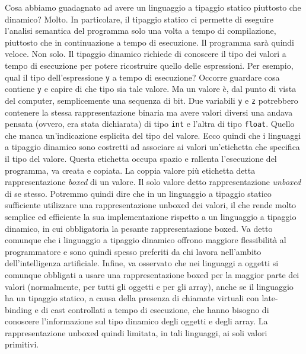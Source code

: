 Cosa abbiamo guadagnato ad avere un linguaggio a tipaggio statico piuttosto
che dina\-mico? Molto. In particolare, il tipaggio statico ci permette di
eseguire l'analisi semantica del programma solo una volta a tempo di
compilazione, piuttosto che in continuazione a tempo di esecuzione.
Il programma sar\`a quindi \piu veloce. Non solo. Il tipaggio dinamico richiede
di conoscere il tipo dei valori a tempo di esecuzione per potere
ricostruire quello delle espressioni. Per
esempio, qual \e il tipo dell'espressione \texttt{y} a tempo di esecuzione?
Occorre guardare cosa contiene \texttt{y} e capire di che tipo sia tale valore.
Ma un valore \`e, dal punto di vista del computer, semplicemente una sequenza
di bit. Due variabili \texttt{y} e \texttt{z} potrebbero contenere la
stessa rappresentazione binaria ma avere valori diversi \poiche una
andava pensata (ovvero, era stata dichiarata)
di tipo \texttt{int} e l'altra di tipo \texttt{float}.
Quello che manca \e un'indicazione esplicita del tipo del valore.
Ecco quindi che i linguaggi a tipaggio dinamico sono costretti
ad associare ai valori un'etichetta che specifica il tipo del valore.
Questa etichetta occupa spazio e rallenta l'esecuzione del programma, \poiche
va creata e copiata.
La coppia valore pi\`u etichetta \e detta rappresentazione \emph{boxed} di
un valore. Il solo valore \e detto rappresentazione \emph{unboxed} di
se stesso. Potremmo quindi dire che in un linguaggio a tipaggio statico
\e sufficiente utilizzare una rappresentazione unboxed dei valori, il che
rende molto \piu semplice ed efficiente la sua implementazione rispetto
a un linguaggio a tipaggio dinamico, in cui \e obbligatoria la \piu pesante
rappresentazione boxed. Va detto comunque che i linguaggio
a tipaggio dinamico offrono maggiore flessibilit\`a al programmatore e sono
quindi spesso preferiti da chi lavora nell'ambito
dell'intelligenza artificiale. Infine, va osservato che nei linguaggi a
oggetti si \e comunque obbligati a usare una rappresentazione boxed per la
maggior parte dei valori (normalmente, per tutti gli oggetti e per gli array),
anche se il linguaggio ha un tipaggio statico,
a causa della presenza di chiamate virtuali con late-binding
e di cast controllati a tempo di esecuzione, che hanno bisogno di conoscere
l'informazione sul tipo dinamico degli oggetti e degli array.
La rappresentazione unboxed \e quindi limitata, in tali linguaggi, ai soli valori primitivi.

